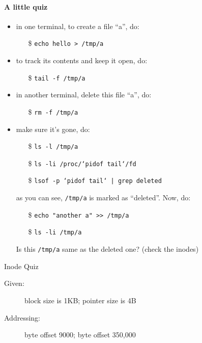 \paragraph{A little quiz}

\begin{itemize}
\item in one terminal, to create a file ``a'', do:
  \begin{itemize}
  \item[\$] \texttt{echo hello > /tmp/a} 
  \end{itemize}
\item to track its contents and keep it open, do:
  \begin{itemize}
  \item[\$] \texttt{tail -f /tmp/a}
  \end{itemize}
\item in another terminal, delete this file ``a'', do:
  \begin{itemize}
  \item[\$] \texttt{rm -f /tmp/a}
  \end{itemize}
\item make sure it's gone, do:
  \begin{itemize}
  \item[\$] \texttt{ls -l /tmp/a}
  \item[\$] \texttt{ls -li /proc/`pidof tail`/fd}
  \item[\$] \texttt{lsof -p `pidof tail` | grep deleted}
  \end{itemize}
  as you can see, \texttt{/tmp/a} is marked as ``deleted''. Now, do:
  \begin{itemize}
  \item[\$] \texttt{echo "another a" >> /tmp/a}
  \item[\$] \texttt{ls -li /tmp/a}
  \end{itemize}
  Is this \texttt{/tmp/a} same as the deleted one? (check the inodes)
\end{itemize}

\begin{frame}{Inode Quiz}
  \begin{description}
  \item[Given:] block size is 1KB; pointer size is 4B
  \item[Addressing:] byte offset 9000; byte offset 350,000
  \end{description}
  \begin{center}
  \end{center}
\end{frame}

